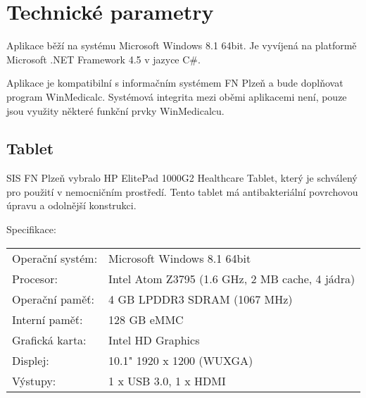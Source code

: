 \setlength{\parskip}{1em}

\chapter{Technické parametry}

Aplikace běží na systému Microsoft Windows 8.1 64bit. Je vyvíjená na platformě Microsoft .NET Framework 4.5 v jazyce C\#.

Aplikace je kompatibilní s informačním systémem FN Plzeň a bude doplňovat program WinMedicalc. Systémová integrita mezi oběmi aplikacemi není, pouze jsou využity některé funkční prvky WinMedicalcu.

\section{Tablet}

SIS FN Plzeň vybralo HP ElitePad 1000G2 Healthcare Tablet, který je schválený pro použití v nemocničním prostředí. Tento tablet má antibakteriální povrchovou úpravu a odolnější konstrukci.

\noindent
Specifikace:

\noindent
\begin{tabular}{l l}
	Operační systém: & Microsoft Windows 8.1 64bit\\
	Procesor: & Intel Atom Z3795 (1.6 GHz, 2 MB cache, 4 jádra)\\
	Operační paměť: & 4 GB LPDDR3 SDRAM (1067 MHz)\\
	Interní paměť: & 128 GB eMMC\\
	Grafická karta: & Intel HD Graphics\\
	Displej: & 10.1" 1920 x 1200 (WUXGA)\\
	Výstupy: & 1 x USB 3.0, 1 x HDMI
\end{tabular}